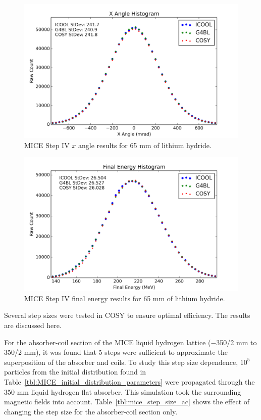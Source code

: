 \begin{figure}[H]
  \centering
    \includegraphics[width=\textwidth]{MICE data/LiH/px} 
  \caption{MICE Step IV $x$ angle results for 65 mm of lithium hydride.}
  \label{fig:mice_lih_xangle}
\end{figure}

\begin{figure}[H]
  \centering
    \includegraphics[width=\textwidth]{MICE data/LiH/e} 
  \caption{MICE Step IV final energy results for 65 mm of lithium hydride.}
  \label{fig:mice_lih_energy}
\end{figure}

\label{ssc:step_size_effects}
Several step sizes were tested in COSY to ensure optimal efficiency. The results are discussed here.

For the absorber-coil section of the MICE liquid hydrogen lattice ($-$350/2 mm to 350/2 mm), it was found that 5 steps were sufficient to approximate the superposition of the absorber and coils. To study this step size dependence, $10^5$ particles from the initial distribution found in Table~\ref{tbl:MICE_initial_distribution_parameters} were propagated through the 350 mm liquid hydrogen flat absorber. This simulation took the surrounding magnetic fields into account. Table~\ref{tbl:mice_step_size_ac} shows the effect of changing the step size for the absorber-coil section only.

